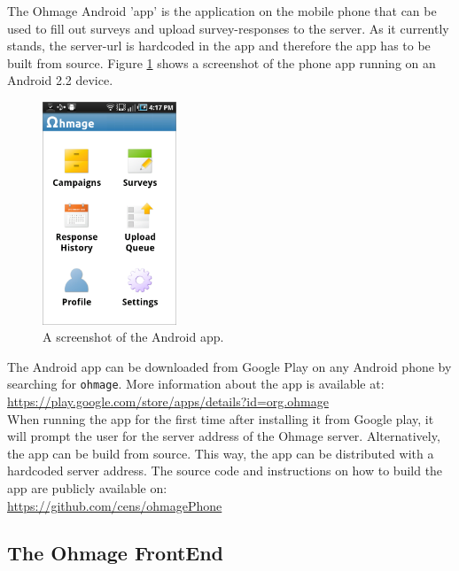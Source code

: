 \documentclass{scrartcl}
\begin{document}
The Ohmage Android 'app' is the application on the mobile phone that can be used
to fill out surveys and upload survey-responses to the server. As it currently
stands, the server-url is hardcoded in the app and therefore the app has to be
built from source. Figure \ref{fig:phone} shows a screenshot of the phone app running on
an Android 2.2 device. \\

\begin{figure}[h!]
\begin{center}
\includegraphics[width=4cm]{app.png}
\caption{A screenshot of the Android app.}
\label{fig:phone}
\end{center}
\end{figure}

\noindent The Android app can be downloaded from Google Play on any
Android phone by searching for \texttt{ohmage}. More information about the
app is available at: \\

\url{https://play.google.com/store/apps/details?id=org.ohmage} \\

When running the app for the first time after installing it from Google play, it
will prompt the user for the server address of the Ohmage server.
Alternatively, the app can be build from source. This way, the app can be
distributed with a hardcoded server address. The source code and instructions on
how to build the app are publicly available on: \\

\url{https://github.com/cens/ohmagePhone} \\

\subsection{The Ohmage FrontEnd}
\end{document}
